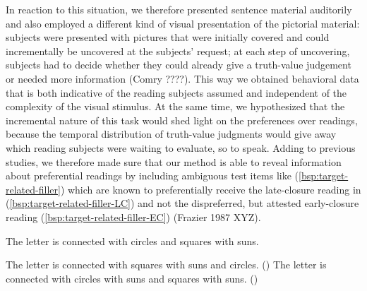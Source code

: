 \documentclass[fleqn,reqno,10pt,draft]{article}
\newcommand{\lc}{\acro{lc}}
\newcommand{\ec}{\acro{ec}}
\newcommand{\LC}{\lc}
\newcommand{\EC}{\ec}
\begin{document}
In reaction to this situation, we therefore presented sentence
material auditorily and also employed a different kind of visual
presentation of the pictorial material: subjects were presented with
pictures that were initially covered and could incrementally be
uncovered at the subjects' request; at each step of uncovering,
subjects had to decide whether they could already give a truth-value
judgement or needed more information (Comry ????). This way we obtained behavioral data that is both
indicative of the reading subjects assumed and independent of the
complexity of the visual stimulus. At the same time, we hypothesized
that the incremental nature of this task would shed light on the
preferences over readings, because the temporal distribution of
truth-value judgments would give away which reading subjects were
waiting to evaluate, so to speak. Adding to previous studies, we
therefore made sure that our method is able to reveal information
about preferential readings by including ambiguous test items like
(\ref{bsp:target-related-filler}) which are known to preferentially
receive the late-closure reading in
(\ref{bsp:target-related-filler-LC}) and not the dispreferred, but
attested early-closure reading (\ref{bsp:target-related-filler-EC})
(Frazier 1987 XYZ).
\begin{exe}
\ex \label{bsp:target-related-filler} The letter is connected with circles and squares with
  suns.
  \begin{xlist}
  \ex \label{bsp:target-related-filler-LC} The letter is connected
    with squares with suns and circles. \hfill (\LC)
  \ex \label{bsp:target-related-filler-EC} The letter is connected
    with circles with suns and squares with suns. \hfill (\EC)
  \end{xlist}
\end{exe}

\end{document}
